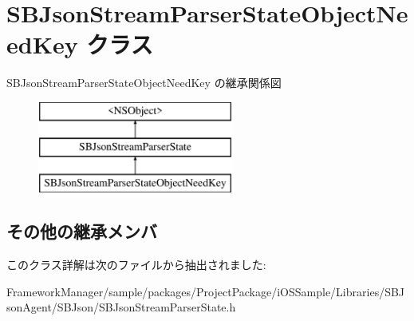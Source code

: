\hypertarget{interface_s_b_json_stream_parser_state_object_need_key}{}\section{S\+B\+Json\+Stream\+Parser\+State\+Object\+Need\+Key クラス}
\label{interface_s_b_json_stream_parser_state_object_need_key}
S\+B\+Json\+Stream\+Parser\+State\+Object\+Need\+Key の継承関係図\begin{figure}[H]
\begin{center}
\leavevmode
\includegraphics[height=3.000000cm]{interface_s_b_json_stream_parser_state_object_need_key}
\end{center}
\end{figure}
\subsection*{その他の継承メンバ}


このクラス詳解は次のファイルから抽出されました\+:\begin{DoxyCompactItemize}
\item 
Framework\+Manager/sample/packages/\+Project\+Package/i\+O\+S\+Sample/\+Libraries/\+S\+B\+Json\+Agent/\+S\+B\+Json/S\+B\+Json\+Stream\+Parser\+State.\+h\end{DoxyCompactItemize}
